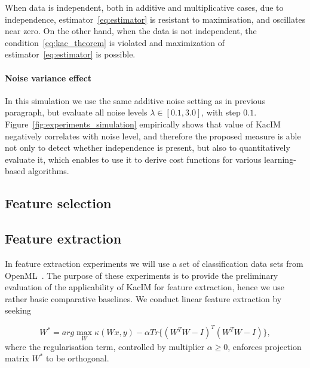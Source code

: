 \documentclass{article}
\begin{document}
When data is independent, both in additive and multiplicative cases, due to independence, estimator~\eqref{eq:estimator} is resistant to maximisation, and oscillates near zero. On the other hand, when the data is not independent, the condition~\eqref{eq:kac_theorem} is violated and maximization of estimator~\eqref{eq:estimator} is possible.
\paragraph{Noise variance effect} In this simulation we use the same additive noise setting as in previous paragraph, but evaluate all noise levels $\lambda \in [0.1, 3.0]$, with step $0.1$.
Figure~\ref{fig:experiments_simulation} empirically shows that value of KacIM  negatively correlates with noise level, and therefore the proposed measure is able not only to detect whether independence is present, but also to quantitatively evaluate it, which enables to use it to derive cost functions for various learning-based algorithms. 



\subsection{Feature selection}

\subsection{Feature extraction}
In feature extraction experiments we will use a set of classification data sets from OpenML~\cite{OpenML2013}. The purpose of these experiments is to provide the preliminary evaluation of the applicability of KacIM for feature extraction, hence we use rather basic comparative baselines. We conduct linear feature extraction by seeking 

\begin{equation}
\label{eq:kim_feature_extraction}    
W^{*} = arg \max_{W} \kappa(Wx, y) - \alpha Tr\{(W^{T}W-I)^{T}(W^{T}W-I) \},
\end{equation}
where the regularisation term, controlled by multiplier $\alpha \geq 0$, enforces projection matrix $W^{*}$ to be orthogonal.

\end{document}
